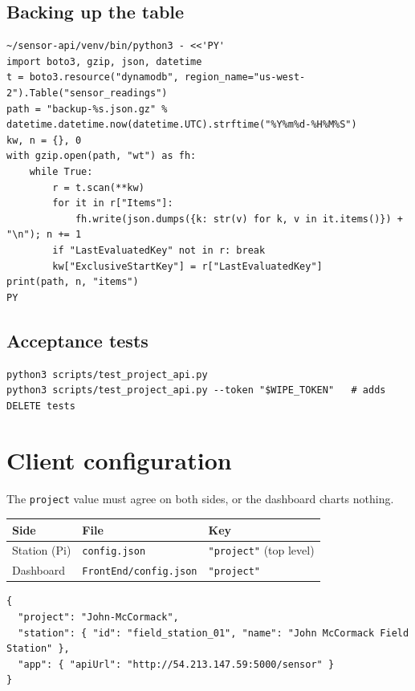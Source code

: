 \documentclass[11pt,a4paper]{article}
\begin{document}
\subsection{Backing up the table}
\begin{lstlisting}
~/sensor-api/venv/bin/python3 - <<'PY'
import boto3, gzip, json, datetime
t = boto3.resource("dynamodb", region_name="us-west-2").Table("sensor_readings")
path = "backup-%s.json.gz" % datetime.datetime.now(datetime.UTC).strftime("%Y%m%d-%H%M%S")
kw, n = {}, 0
with gzip.open(path, "wt") as fh:
    while True:
        r = t.scan(**kw)
        for it in r["Items"]:
            fh.write(json.dumps({k: str(v) for k, v in it.items()}) + "\n"); n += 1
        if "LastEvaluatedKey" not in r: break
        kw["ExclusiveStartKey"] = r["LastEvaluatedKey"]
print(path, n, "items")
PY
\end{lstlisting}

\subsection{Acceptance tests}
\begin{lstlisting}
python3 scripts/test_project_api.py
python3 scripts/test_project_api.py --token "$WIPE_TOKEN"   # adds DELETE tests
\end{lstlisting}

\section{Client configuration}

The \texttt{project} value must agree on both sides, or the dashboard
charts nothing.

\begin{center}
\begin{tabular}{@{}lll@{}}
\toprule
Side & File & Key \\
\midrule
Station (Pi) & \texttt{config.json}          & \texttt{"project"} (top level) \\
Dashboard    & \texttt{FrontEnd/config.json} & \texttt{"project"} \\
\bottomrule
\end{tabular}
\end{center}

\begin{lstlisting}
{
  "project": "John-McCormack",
  "station": { "id": "field_station_01", "name": "John McCormack Field Station" },
  "app": { "apiUrl": "http://54.213.147.59:5000/sensor" }
}
\end{lstlisting}
\end{document}
